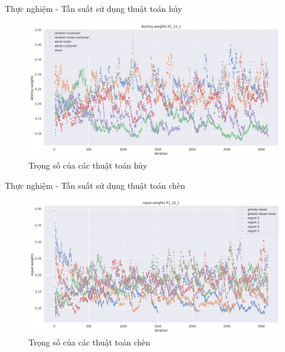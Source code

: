 \begin{frame}{Thực nghiệm - Tần suất sử dụng thuật toán hủy}
  \begin{figure}[H] %
    \centering %
    \includegraphics[width=1\textwidth]{figures/destroy_weights_R1_10_1.png}
    \caption{Trọng số của các thuật toán hủy}
    \label{fig:alg_01}
  \end{figure}
\end{frame}

\begin{frame}{Thực nghiệm - Tần suất sử dụng thuật toán chèn}
  \begin{figure}[H] %
    \centering %
    \includegraphics[width=1\textwidth]{figures/repair_weights_R1_10_1.png}
    \caption{Trọng số của các thuật toán chèn}
    \label{fig:alg_02}
  \end{figure}
\end{frame}